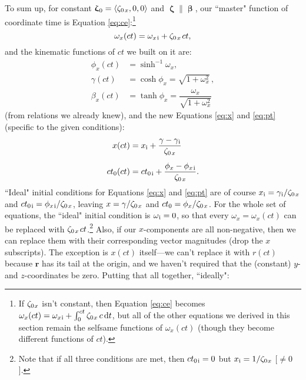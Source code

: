 \documentclass[12pt]{article}
\renewcommand{\vv}[1]{\mathbf{#1}}
\newcommand{\dd}[1]{\mathrm{d}#1}
\newcommand{\vvbeta}{\bm{\upbeta}}
\newcommand{\vvzeta}{\bm{\upzeta}}
\begin{document}
To sum up, for constant $\vvzeta_{\mkern1mu 0} = \langle \zeta_{0 \mkern2mu x} , 0, 0 \rangle$ and $\vvzeta \parallel \vvbeta$, our ``master" function of coordinate time is Equation \ref{eq:ce}:\footnote{If $\zeta_{0 \mkern1mu x}$ isn't constant, then Equation \ref{eq:ce} becomes $\omega_x (ct) = \omega_{x \mkern1mu \textrm{i} } + \int_0^{ct} \zeta_{0 \mkern1mu x} \, c \, \dd t$, but all of the other equations we derived in this section remain the selfsame functions of $\omega_x (ct)$ (though they become different functions of $ct$).}
\begin{equation*}
\omega_x (ct) = \omega_{x \mkern2mu \textrm{i} } + \zeta_{0 \mkern2mu x} \mkern2mu ct ,
\end{equation*}
and the kinematic functions of $ct$ we built on it are:
\begin{equation*}
\begin{aligned}
\phi_x (ct) &= \sinh^{-1} \omega_x , \\[5pt]
\gamma (ct) &= \cosh \phi_x = \sqrt{1 + \omega^2_x} \, , \\[3pt]
\beta_x (ct) &= \tanh \phi_x = \dfrac{\omega_x}{\sqrt{1 + \omega^2_x }}
\end{aligned}
\end{equation*}
(from relations we already knew), and the new Equations \ref{eq:x} and \ref{eq:pt} (specific to the given conditions):
\begin{equation*}
\begin{aligned}
x (ct) &= x_{\mathrm{i}} + \dfrac{ \gamma - \gamma_{\mkern1mu \mathrm{i}} }{ \zeta_{0 \mkern2mu x}} \\[5pt]
ct_0 (ct) &= ct_{0 \mkern2mu \mathrm{i}} + \dfrac{ \phi_x - \phi_{x \mkern2mu \mathrm{i} }}{ \zeta_{0 \mkern2mu x}} .
\end{aligned}
\end{equation*}
``Ideal" initial conditions for Equations \ref{eq:x} and \ref{eq:pt} are of course $x_{\mathrm{i}} = \gamma_{\mkern1mu \mathrm{i}} / \zeta_{0 \mkern2mu x}$ and $ct_{0 \mkern2mu \mathrm{i}} = \phi_{x \mkern2mu \mathrm{i} } / \zeta_{0 \mkern2mu x}$, leaving $x = \gamma / \zeta_{0 \mkern2mu x}$ and $ct_0 = \phi_x / \zeta_{0 \mkern2mu x}$. For the whole set of equations, the ``ideal" initial condition is $\omega_{\mkern1mu \textrm{i}} = 0$, so that every $\omega_x = \omega_x (ct)$ can be replaced with $\zeta_{0 \mkern2mu x} \mkern2mu ct$.\footnote{Note that if all three conditions are met, then $ct_{0 \mkern2mu \mathrm{i}} = 0$ but $x_{\mathrm{i}} = 1 / \zeta_{0 \mkern1mu x}$ [$\neq 0$].} Also, if our $x$-components are all non-negative, then we can replace them with their corresponding vector magnitudes (drop the $x$ subscripts). The exception is $x(ct)$ itself---we can't replace it with $r(ct)$ because $\vv r$ has its tail at the origin, and we haven't required that the (constant) $y$- and $z$-coordinates be zero. Putting that all together, ``ideally":
\end{document}
